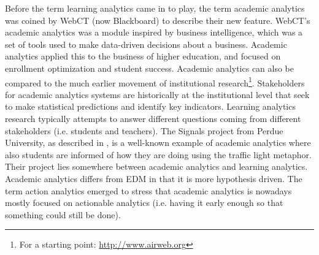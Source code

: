 \documentclass[11pt]{article}
\begin{document}
Before the term learning analytics came in to play, the term academic analytics was coined by WebCT (now Blackboard) to describe their new feature. WebCT's academic analytics was a module inspired by business intelligence, which was a set of tools used to make data-driven decisions about a business. Academic analytics applied this to the business of higher education, and focused on enrollment optimization and student success. Academic analytics can also be compared to the much earlier movement of institutional research\footnote{For a starting point: \url{http://www.airweb.org}}. Stakeholders for academic analytics systems are historically at the institutional level that seek to make statistical predictions and identify key indicators. Learning analytics research typically attempts to answer different questions coming from different stakeholders (i.e. students and teachers). The Signals project from Perdue University, as described in \cite{Arnold2010}, is a well-known example of academic analytics where also students are informed of how they are doing using the traffic light metaphor. Their project lies somewhere between academic analytics and learning analytics. Academic analytics differs from EDM in that it is more hypothesis driven. The term action analytics emerged to stress that academic analytics is nowadays mostly focused on actionable analytics (i.e. having it early enough so that something could still be done).
\end{document}
